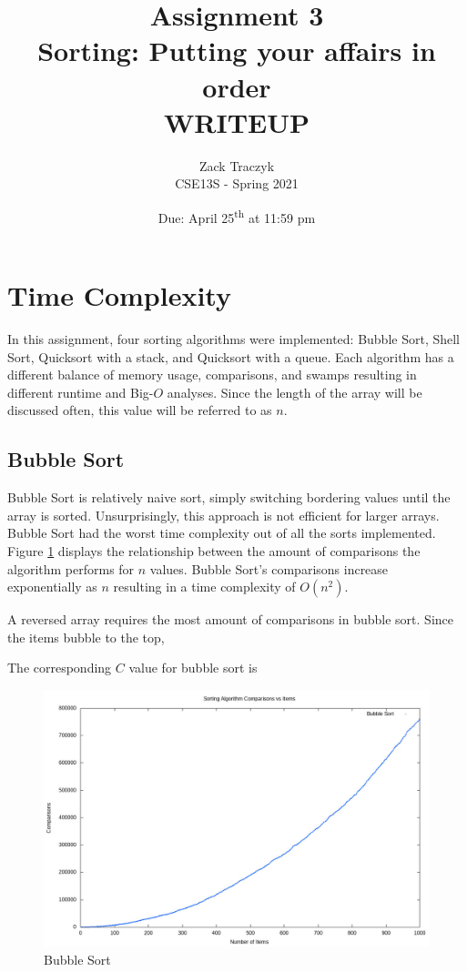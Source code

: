\documentclass[12pt]{article}
\title{%
	\textbf{Assignment 3 \\ 
	Sorting: Putting your affairs in order \\
	\large WRITEUP} }
\author{Zack Traczyk \\ CSE13S - Spring 2021}
\date{Due: April 25\textsuperscript{th} at 11:59 pm}
\begin{document}
	\maketitle

	\section{Time Complexity}

	In this assignment, four sorting algorithms were implemented:
	Bubble Sort, Shell Sort, Quicksort with a stack, and Quicksort with a queue.
	Each algorithm has a different balance of memory usage, comparisons, and swamps resulting in different runtime and Big-$O$ analyses.
	Since the length of the array will be discussed often, this value will be referred to as $n$.


	\subsection{Bubble Sort}

	Bubble Sort is relatively naive sort, simply switching bordering values until the array is sorted.
	Unsurprisingly, this approach is not efficient for larger arrays.
	Bubble Sort had the worst time complexity out of all the sorts implemented.
	Figure \ref{bubble} displays the relationship between the amount of comparisons the algorithm performs for $n$ values.
	Bubble Sort's comparisons increase exponentially as $n$ resulting in a time complexity of $O(n^2)$.

	A reversed array requires the most amount of comparisons in bubble sort. Since the items bubble to the top,

	The corresponding $C$ value for bubble sort is 

	\begin{figure}[H]
		\caption{Bubble Sort}\label{bubble}
		\includegraphics[width=6in]{bubble}
		\centering
	\end{figure}
\end{document}
